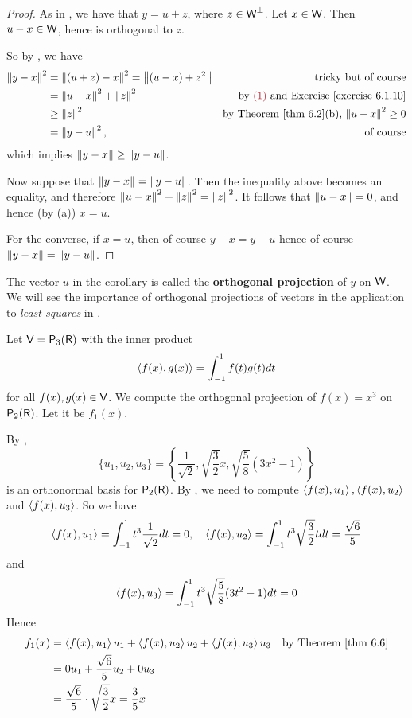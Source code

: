 \begin{proof}
As in , we have that \(y = u + z\), where \(z \in \textsf{W}^{\perp}\).
Let \(x \in \textsf{W}\).
Then \(u - x \in \textsf{W}\), hence is orthogonal to \(z\). 

So by , we have
\begin{align*}
    \norm{y - x}^2 & = \norm{(u + z) - x}^2 = \norm{(u - x) + z^2} & \text{tricky but of course} \\
        & = \norm{u - x}^2 + \norm{z}^2 & \text{by \MAROON{(1)} and \EXEC{6.1.10}} \\
        & \ge \norm{z}^2 & \text{by \THM{6.2}(b), \(\norm{u - x}^2 \ge 0\)} \\
        & = \norm{y - u}^2, & \text{of course}
\end{align*}
which implies \(\left\lVert y - x\right\rVert \ge \left\lVert y - u\right\rVert\).

Now suppose that \(\left\lVert y - x\right\rVert = \left\lVert y - u\right\rVert\).
Then the inequality above becomes an equality, and therefore \(\left\lVert u - x\right\rVert^2 + \left\lVert z\right\rVert^2 = \left\lVert z\right\rVert^2\).
It follows that \(\left\lVert u - x\right\rVert = 0\), and hence (by (a)) \(x = u\).

For the converse, if \(x = u\), then of course \(y - x = y - u\) hence of course \(\left\lVert y - x\right\rVert = \left\lVert y - u\right\rVert\).
\end{proof}

\begin{additional definition} \label{adef 6.3}
The vector \(u\) in the corollary is called the \textbf{orthogonal projection} of \(y\) on \(\textsf{W}\).
We will see the importance of orthogonal projections of vectors in the application to \emph{least squares} in .
\end{additional definition}

\begin{example} \label{example 6.2.10}
Let \(\textsf{V} = \textsf{P}_3(\textsf{R})\) with the inner product
\[
    \left< f(x),g(x) \right> = \int_{-1}^{1} f(t)g(t) dt
\]
for all \(f(x), g(x) \in \textsf{V}\).
We compute the orthogonal projection of \(f(x) = x^3\) on \(\textsf{P}_2(\textsf{R})\).
Let it be \(f_1(x)\).

By ,
\[
    \{ u_1, u_2, u_3 \} = \left\{ \frac{1}{\sqrt{2}}, \sqrt{\frac{3}{2}} x, \sqrt{\frac{5}{8}}(3x^2 - 1) \right\}
\]
is an orthonormal basis for \(\textsf{P}_2(\textsf{R})\).
By , we need to compute \(\left< f(x), u_1 \right>, \left< f(x), u_2 \right>\) and \(\left< f(x), u_3 \right>\).
So we have
\[
    \left< f(x), u_1 \right> = \int_{-1}^{1} t^3 \frac{1}{\sqrt{2}} dt = 0,
    \quad \left< f(x), u_2 \right> = \int_{-1}^{1} t^3 \sqrt{\frac{3}{2}} t dt = \frac{\sqrt{6}}{5}
\]
and
\[
    \left< f(x), u_3 \right> = \int_{-1}^{1} t^{3} \sqrt{\frac{5}{8}} (3 t^2 - 1) dt = 0
\]
Hence
\begin{align*}
    f_{1}(x) & = \LG f(x), u_1 \RG u_1 + \LG f(x), u_2 \RG u_2 + \LG f(x), u_3 \RG u_3 & \text{by \THM{6.6}} \\
        & = 0 u_1 + \frac{\sqrt{6}}{5} u_2 + 0 u_3 \\
        & = \frac{\sqrt{6}}{5} \cdot \sqrt{\frac{3}{2}}x = \frac{3}{5} x
\end{align*}
\end{example}

